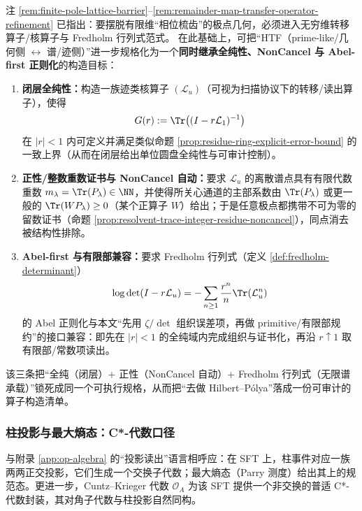 \begin{remark}\label{rem:positive-fredholm-htf}
注 \ref{rem:finite-pole-lattice-barrier}--\ref{rem:remainder-map-transfer-operator-refinement} 已指出：要摆脱有限维“相位梳齿”的极点几何，必须进入无穷维转移算子/核算子与 Fredholm 行列式范式。
在此基础上，可把“HTF（prime-like/几何侧 \(\leftrightarrow\) 谱/迹侧）”进一步规格化为一个\textbf{同时继承全纯性、NonCancel 与 Abel-first 正则化}的构造目标：
\begin{enumerate}
  \item \textbf{闭层全纯性：}构造一族迹类核算子 \((\mathcal{L}_u)\)（可视为扫描协议下的转移/读出算子），使得
  \[
  G(r):=\Tr\bigl((I-r\mathcal{L}_1)^{-1}\bigr)
  \]
  在 \(|r|<1\) 内可定义并满足类似命题 \ref{prop:residue-ring-explicit-error-bound} 的一致上界（从而在闭层给出单位圆盘全纯性与可审计控制）。
  \item \textbf{正性/整数重数证书与 NonCancel 自动：}要求 \(\mathcal{L}_u\) 的离散谱点具有有限代数重数 \(m_\lambda=\Tr(P_\lambda)\in\NN\)，并使得所关心通道的主部系数由 \(\Tr(P_\lambda)\) 或更一般的 \(\Tr(WP_\lambda)\ge 0\)（某个正算子 \(W\)）给出；于是任意极点都携带不可为零的留数证书（命题 \ref{prop:resolvent-trace-integer-residue-noncancel}），同点消去被结构性排除。
  \item \textbf{Abel-first 与有限部兼容：}要求 Fredholm 行列式（定义 \ref{def:fredholm-determinant}）
  \[
  \log\det(I-r\mathcal{L}_u)=-\sum_{n\ge 1}\frac{r^n}{n}\Tr(\mathcal{L}_u^n)
  \]
  的 Abel 正则化与本文“先用 \(\zeta/\det\) 组织误差项，再做 primitive/有限部规约”的接口兼容：即先在 \(|r|<1\) 的全纯域内完成组织与证书化，再沿 \(r\uparrow 1\) 取有限部/常数项读出。
\end{enumerate}
该三条把“全纯（闭层）+ 正性（NonCancel 自动）+ Fredholm 行列式（无限谱承载）”锁死成同一个可执行规格，从而把“去做 Hilbert--P{\'o}lya”落成一份可审计的算子构造清单。
\end{remark}

\subsubsection{柱投影与最大熵态：C*-代数口径}

与附录 \ref{app:op-algebra} 的“投影读出”语言相呼应：在 SFT 上，柱事件对应一族两两正交投影，它们生成一个交换子代数；最大熵态（Parry 测度）给出其上的规范态。更进一步，Cuntz--Krieger 代数 $\mathcal{O}_A$ 为该 SFT 提供一个非交换的普适 C*-代数封装，其对角子代数与柱投影自然同构。

